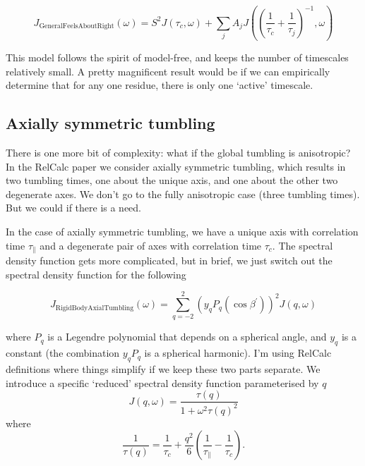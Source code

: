 \documentclass[showkeys,aps,prb,prepreint,amssymb, amsmath,nobibnotes]{article}
\begin{document}
\begin{equation}
  J_{\mathrm{GeneralFeelsAboutRight}}(\omega)= S^2 J(\tau_c,\omega) + \sum_{j} A_{j} J\left(  \left(\frac{1}{\tau_c}+\frac{1}{\tau_j}\right)^{-1},\omega\right)
  \end{equation}

This model follows the spirit of model-free, and keeps the number of timescales relatively small. A pretty magnificent result would be if we can empirically determine that for any one residue, there is only one `active' timescale.

\subsection{Axially symmetric tumbling}

There is one more bit of complexity: what if the global tumbling is anisotropic? In the RelCalc paper we consider axially symmetric tumbling, which results in two tumbling times, one about the unique axis, and one about the other two degenerate axes. We don't go to the fully anisotropic case (three tumbling times). But we could if there is a need.

In the case of axially symmetric tumbling, we have a unique axis with correlation time $\tau_\parallel$ and a degenerate pair of axes with correlation time $\tau_c$. The spectral density function gets more complicated, but in brief, we just switch out the spectral density function for the following

\begin{equation}
J_{\mathrm{RigidBodyAxialTumbling}}\left(\omega \right) = \sum_{q=-2}^2   \left(y_{q}P_q\left(\cos\beta^{\prime} \right)\right)^2   J\left(q,\omega\right)
    \end{equation}

where $P_q$ is a Legendre polynomial that depends on a spherical angle, and $y_q$ is a constant (the combination $y_qP_q$ is a spherical harmonic). I'm using RelCalc definitions where things simplify if we keep these two parts separate. We introduce a specific `reduced' spectral density function parameterised by $q$
\begin{equation}
  J\left(q,\omega\right)=\frac{\tau(q)}{1+\omega^2\tau(q)^2} 
\end{equation}
where
\begin{equation}
  \frac{1}{\tau(q)}=\frac{1}{\tau_c} +\frac{q^2}{6}\left(\frac{1}{\tau_\parallel}- \frac{1}{\tau_c} \right).
  \end{equation}
\end{document}
